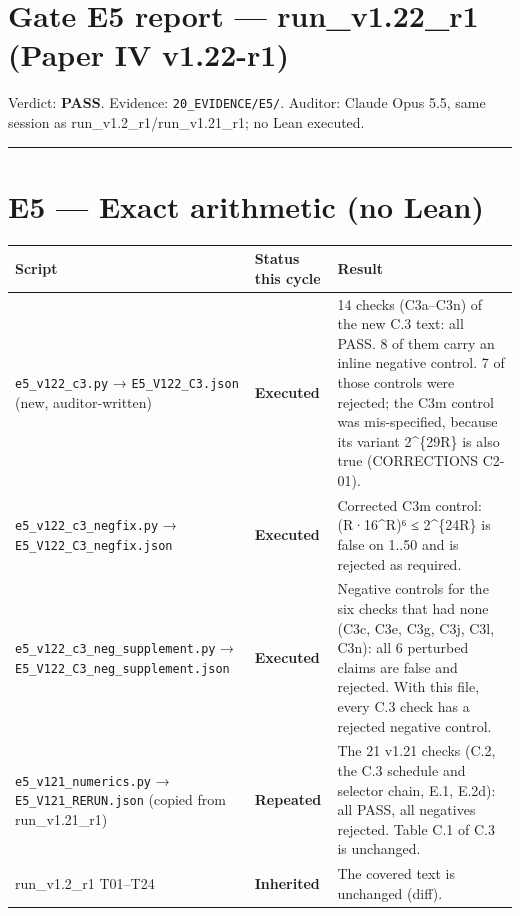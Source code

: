 \documentclass[
]{article}
\author{}
\date{}
\newcounter{none} %
\begin{document}
\section{Gate E5 report --- run\_v1.22\_r1 (Paper IV
v1.22-r1)}\label{gate-e5-report--run_v122_r1-paper-iv-v122-r1}

Verdict: \textbf{PASS}. Evidence: \texttt{20\_EVIDENCE/E5/}. Auditor:
Claude Opus 5.5, same session as run\_v1.2\_r1/run\_v1.21\_r1; no Lean
executed.

\begin{center}\rule{0.5\linewidth}{0.5pt}\end{center}

\section{E5 --- Exact arithmetic (no
Lean)}\label{e5--exact-arithmetic-no-lean}

{\def\LTcaptype{none} %
\begin{longtable}[]{@{}lll@{}}
\toprule\noalign{}
Script & Status this cycle & Result \\
\midrule\noalign{}
\endhead
\bottomrule\noalign{}
\endlastfoot
\texttt{e5\_v122\_c3.py} → \texttt{E5\_V122\_C3.json} (new,
auditor-written) & \textbf{Executed} & 14 checks (C3a--C3n) of the new
C.3 text: all PASS. 8 of them carry an inline negative control. 7 of
those controls were rejected; the C3m control was mis-specified, because
its variant 2\^{}\{29R\} is also true (CORRECTIONS C2-01). \\
\texttt{e5\_v122\_c3\_negfix.py} → \texttt{E5\_V122\_C3\_negfix.json} &
\textbf{Executed} & Corrected C3m control: (R·16\^{}R)⁶ ≤ 2\^{}\{24R\}
is false on 1..50 and is rejected as required. \\
\texttt{e5\_v122\_c3\_neg\_supplement.py} →
\texttt{E5\_V122\_C3\_neg\_supplement.json} & \textbf{Executed} &
Negative controls for the six checks that had none (C3c, C3e, C3g, C3j,
C3l, C3n): all 6 perturbed claims are false and rejected. With this
file, every C.3 check has a rejected negative control. \\
\texttt{e5\_v121\_numerics.py} → \texttt{E5\_V121\_RERUN.json} (copied
from run\_v1.21\_r1) & \textbf{Repeated} & The 21 v1.21 checks (C.2, the
C.3 schedule and selector chain, E.1, E.2d): all PASS, all negatives
rejected. Table C.1 of C.3 is unchanged. \\
run\_v1.2\_r1 T01--T24 & \textbf{Inherited} & The covered text is
unchanged (diff). \\
\end{longtable}
}
\end{document}
